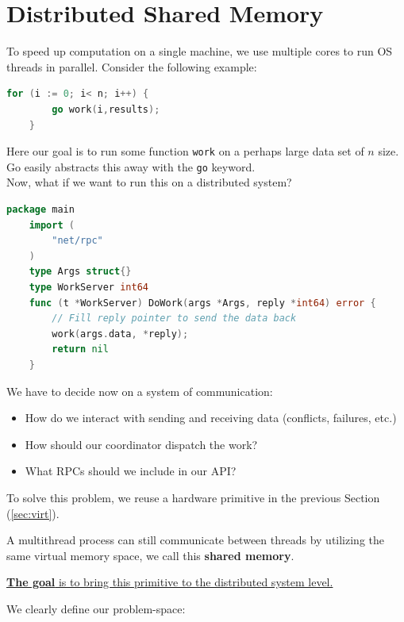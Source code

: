 \newpage
\section{Distributed Shared Memory}
To speed up computation on a single machine, we use multiple cores to 
run OS threads in parallel. Consider the following example:

\begin{lstlisting}[language=Go]
    for (i := 0; i< n; i++) {
        go work(i,results);
    }  
\end{lstlisting}

\noindent
Here our goal is to run some function \texttt{work} on a perhaps large 
data set of $n$ size. Go easily abstracts this away with the \texttt{go} keyword.\\

\noindent
Now, what if we want to run this on a distributed system?

\begin{lstlisting}[language=Go]
    package main
    import (
        "net/rpc"
    )
    type Args struct{}
    type WorkServer int64
    func (t *WorkServer) DoWork(args *Args, reply *int64) error {
        // Fill reply pointer to send the data back
        work(args.data, *reply);
        return nil
    }
\end{lstlisting}

\noindent
We have to decide now on a system of communication:
\begin{itemize}
    \item How do we interact with sending and receiving data (conflicts, failures, etc.)
    \item How should our coordinator dispatch the work?
    \item What RPCs should we include in our API?
\end{itemize}

\noindent
To solve this problem, we reuse a hardware primitive in the previous Section (\ref{sec:virt}).
\begin{theo}

    A multithread process can still communicate between threads by utilizing the same virtual memory space, we call this \textbf{shared memory}.
\end{theo}
\noindent
\underline{\textbf{The goal} is to bring this primitive to the distributed system level.}

\newpage 

\noindent
We clearly define our problem-space:


